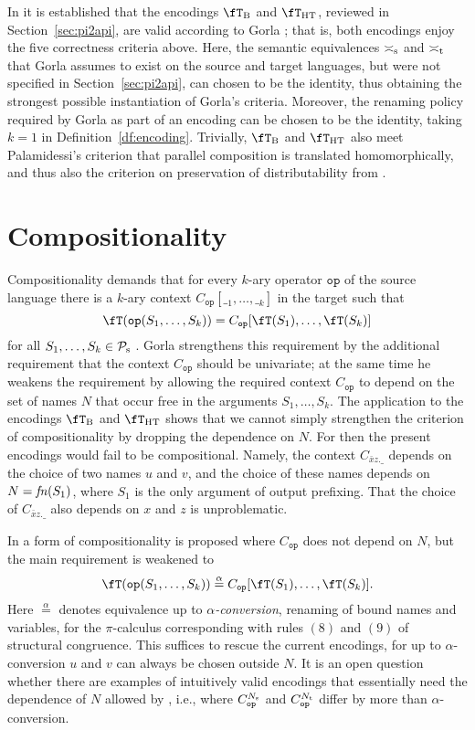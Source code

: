 \documentclass[runningheads]{llncs}
\newcommand{\df}[1]{Definition~\ref{df:#1}}
\newcommand{\sect}[1]{Section~\ref{sec:#1}}
\newcommand{\fTHT}{\fT_{\textrm{HT}}}       %
\newcommand{\fn}{{\it fn}}               %
\newcommand{\trans}[1]{\fT(#1)}
\newcommand{\op}{\mathtt{op}}
\begin{document}
In \cite{vG18a} it is established that the encodings $\fT_{\rm B}$ and $\fTHT$, reviewed in \sect{pi2api},
are valid according to Gorla \cite{Gorla10a}; that is, both encodings enjoy the five correctness criteria above.
Here, the semantic equivalences $\asymp_{\rm s}$ and $\asymp_{\rm t}$ that Gorla assumes to exist on the source
and target languages, but were not specified in \sect{pi2api}, can chosen to be the identity, thus
obtaining the strongest possible instantiation of Gorla's criteria.
Moreover, the renaming policy required by Gorla as part of an encoding can be chosen to be the identity,
taking $k\mathbin=1$ in \df{encoding}.
Trivially, $\fT_{\rm B}$ and $\fT_{\rm HT}$ also meet Palamidessi's criterion that
parallel composition is translated homomorphically, and thus also the criterion on preservation of
distributability from \cite{PNG13}.


\section{Compositionality}\label{sec:compositionality}

Compositionality demands that for every $k$-ary operator $\op$ of the source language
there is a $k$-ary context $C_\op[\__1,\dots,\__k]$ in the target such that
  $$\trans{\op(S_1,\ldots,S_k)} = C_\op[\trans{S_1},\ldots,\trans{S_k}]$$
for all $S_1,\ldots,S_k\in\mathcal{P}_{\rm s}$ \cite{Bo85}. Gorla \cite{Gorla10a} strengthens this
requirement by the additional requirement that the context $C_\op$ should be univariate; at the same
time he weakens the requirement by allowing the required context $C_\op$ to 
depend on the set of names $N$ that occur free in the arguments $S_1,\ldots,S_k$.
The application to the encodings $\fT_{\rm B}$ and $\fT_{\rm HT}$ shows that we cannot simply
strengthen the criterion of compositionality by dropping the dependence on $N$. For then the present
encodings would fail to be compositional. Namely, the context $C_{\bar xz.\_}$ depends on the choice of two
names $u$ and $v$, and the choice of these names depends on $N=\fn(S_1)$, where $S_1$ is the only
argument of output prefixing. That the choice of  $C_{\bar xz.\_}$ also depends on $x$ and $z$ is unproblematic.

In \cite{vG18b} a form of compositionality is proposed where $C_\op$ does not depend on $N$,
but the main requirement is weakened to
  $$\trans{\op(S_1,\ldots,S_k)} \stackrel\alpha= C_\op[\trans{S_1},\ldots,\trans{S_k}].$$
Here $\stackrel\alpha=$ denotes equivalence up to \emph{$\alpha$-conversion}, renaming of bound
names and variables, for the $\pi$-calculus corresponding with rules $\scriptstyle{(8)}$ and $\scriptstyle{(9)}$ of
structural congruence. This suffices to rescue the current encodings, for up to $\alpha$-conversion
$u$ and $v$ can always be chosen outside $N$. It is an open question whether
there are examples of intuitively valid encodings that essentially need the dependence of $N$ allowed
by \cite{Gorla10a}, i.e., where $C_\op^{N_{\rm s}}$ and $C_\op^{N_{\rm t}}$ differ by more than $\alpha$-conversion.
\end{document}
